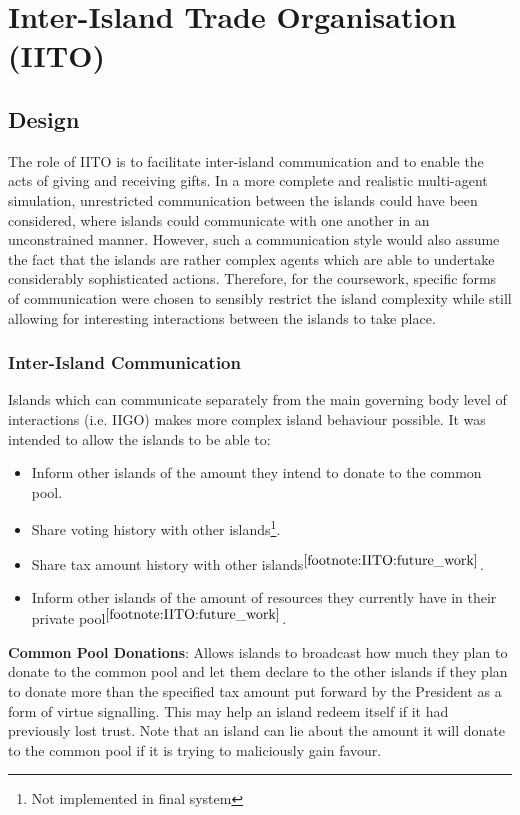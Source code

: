 \chapter{Inter-Island Trade Organisation (IITO)}

\section{Design}
\label{sec:IITO:Design}

The role of IITO is to facilitate inter-island communication and to enable the acts of giving and receiving gifts. In a more complete and realistic multi-agent simulation, unrestricted communication between the islands could have been considered, where islands could communicate with one another in an unconstrained manner. However, such a communication style would also assume the fact that the islands are rather complex agents which are able to undertake considerably sophisticated actions. Therefore, for the coursework, specific forms of communication were chosen to sensibly restrict the island complexity while still allowing for interesting interactions between the islands to take place.

\subsection{Inter-Island Communication}  
\label{subsec:IITO:inter_island_communication}

Islands which can communicate separately from the main governing body level of interactions (i.e. IIGO) makes more complex island behaviour possible. It was intended to allow the islands to be able to:

\begin{itemize}
    \item Inform other islands of the amount they intend to donate to the common pool.
    \item Share voting history with other islands\footnote{\label{footnote:IITO:future_work}Not implemented in final system}.
    \item Share tax amount history with other islands$^{\ref{footnote:IITO:future_work}}$.
    \item Inform other islands of the amount of resources they currently have in their private pool$^{\ref{footnote:IITO:future_work}}$.
\end{itemize}


\textbf{Common Pool Donations}: Allows islands to broadcast how much they plan to donate to the common pool and let them declare to the other islands if they plan to donate more than the specified tax amount put forward by the President as a form of virtue signalling. This may help an island redeem itself if it had previously lost trust. Note that an island can lie about the amount it will donate to the common pool if it is trying to maliciously gain favour.

